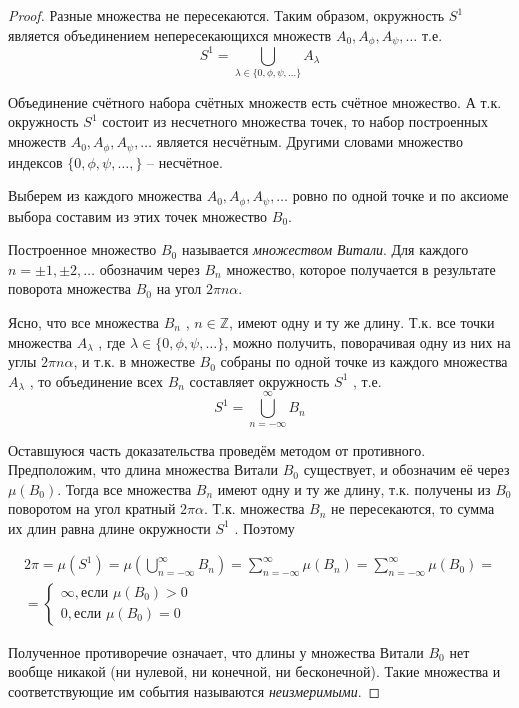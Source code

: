 \begin{proof}
Разные множества не пересекаются. Таким образом, окружность $S^1$ является объединением непересекающихся множеств $A_0, A_\phi, A_\psi , \ldots $ т.е.
\begin{equation*}
	S^1=\bigcup\limits_{\lambda\in\{0,\phi,\psi,\ldots\}}A_\lambda
\end{equation*}

Объединение счётного набора счётных множеств есть счётное множество.
А т.к. окружность $S^1$ состоит из несчетного множества точек, то набор построенных множеств $A_0, A_\phi, A_\psi , \ldots $ является несчётным. Другими словами множество индексов $\{0, \phi, \psi, \ldots ,\}$ -- несчётное.

Выберем из каждого множества $A_0, A_\phi, A_\psi , \ldots $ ровно по одной точке и по аксиоме выбора составим из этих точек множество $B_0$. 

Построенное множество $B_0$ называется \textit{множеством Витали}. Для каждого $n=\pm1, \pm2, \ldots$ обозначим через $B_n$ множество, которое получается в результате поворота множества $B_0$ на угол $2\pi n\alpha$. 

Ясно, что все множества $B_n$ , $n\in \mathbb{Z}$, имеют одну и ту же длину. Т.к. все точки множества $A_\lambda$ , где $\lambda \in \{0, \phi, \psi, \ldots\}$, можно получить, поворачивая одну из них на углы $2\pi n\alpha$, и т.к. в множестве $B_0$ собраны по одной точке из каждого множества $A_\lambda$ , то объединение всех $B_n$ составляет окружность $S^1$ , т.е.
\begin{equation*}
	S^1=\bigcup\limits_{n=-\infty}^{\infty}B_n
\end{equation*}

Оставшуюся часть доказательства проведём методом от противного. Предположим, что длина множества Витали $B_0$ существует, и обозначим её через $\mu(B_0)$. Тогда все множества $B_n$ имеют одну и ту же длину, т.к. получены из $B_0$ поворотом на угол кратный $2\pi\alpha$. Т.к. множества $B_n$ не пересекаются, то сумма их длин равна длине окружности $S^1$ . Поэтому

\begin{gather*}
	2\pi=\mu(S^1)=\mu\left(\bigcup\limits_{n=-\infty}^{\infty}B_n\right)=\sum\limits_{n=-\infty}^{\infty}\mu(B_n)=
	\sum\limits_{n=-\infty}^{\infty}\mu(B_0)=\\
	=
	\left\{
		\begin{aligned}
			\infty, \text{если } \mu(B_0)>0\\
			0, \text{если } \mu(B_0)=0
		\end{aligned}
	\right.
\end{gather*}

Полученное противоречие означает, что длины у множества Витали $B_0$ нет вообще никакой (ни нулевой, ни конечной, ни бесконечной). Такие множества и соответствующие им события называются \textit{неизмеримыми}.
\end{proof}

